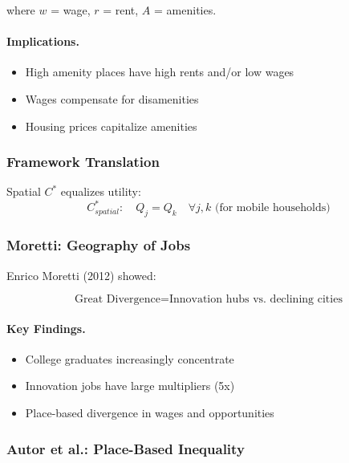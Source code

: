 where $w$ = wage, $r$ = rent, $A$ = amenities.

\paragraph{Implications.}
\begin{itemize}
    \item High amenity places have high rents and/or low wages
    \item Wages compensate for disamenities
    \item Housing prices capitalize amenities
\end{itemize}

\subsubsection{Framework Translation}

Spatial $C^*$ equalizes utility:
\begin{equation}
C^*_{spatial}: \quad Q_j = Q_k \quad \forall j, k \text{ (for mobile households)}
\end{equation}

\subsubsection{Moretti: Geography of Jobs}

Enrico Moretti (2012) showed:

\begin{equation}
\text{Great Divergence} = \text{Innovation hubs vs. declining cities}
\end{equation}

\paragraph{Key Findings.}
\begin{itemize}
    \item College graduates increasingly concentrate
    \item Innovation jobs have large multipliers (5x)
    \item Place-based divergence in wages and opportunities
\end{itemize}

\subsubsection{Autor et al.: Place-Based Inequality}

